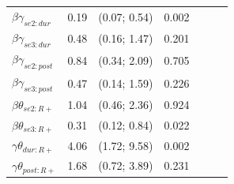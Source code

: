 \documentclass[
  ignorenonframetext,
  serif,
  professionalfont,
  usenames,
  dvipsnames,
  aspectratio = 169]{beamer}
\begin{document}
\begin{frame}{}
\begin{table}[h]
\begin{tabular}{lcccccc}
        \multicolumn{1}{l|}{$\beta\gamma_{se2:dur}$}  & {\color[HTML]{000000} 0.19} & {\color[HTML]{000000} (0.07; 0.54)} & \multicolumn{1}{c|}{{\color[HTML]{000000} 0.002}} & {\color[HTML]{000000} }      &              &                 \\
        \multicolumn{1}{l|}{$\beta\gamma_{se3:dur}$}  & {\color[HTML]{000000} 0.48} & {\color[HTML]{000000} (0.16; 1.47)} & \multicolumn{1}{c|}{{\color[HTML]{000000} 0.201}}            & {\color[HTML]{000000} }      &              &                 \\
        \multicolumn{1}{l|}{$\beta\gamma_{se2:post}$} & {\color[HTML]{000000} 0.84} & {\color[HTML]{000000} (0.34; 2.09)} & \multicolumn{1}{c|}{{\color[HTML]{000000} 0.705}}            & {\color[HTML]{000000} }      &              &                 \\
        \multicolumn{1}{l|}{$\beta\gamma_{se3:post}$} & {\color[HTML]{000000} 0.47} & {\color[HTML]{000000} (0.14; 1.59)} & \multicolumn{1}{c|}{{\color[HTML]{000000} 0.226}}            & {\color[HTML]{000000} }      &              &                 \\
        \multicolumn{1}{l|}{$\beta\theta_{se2:R+}$}   & {\color[HTML]{000000} 1.04} & {\color[HTML]{000000} (0.46; 2.36)} & \multicolumn{1}{c|}{{\color[HTML]{000000} 0.924}}            & {\color[HTML]{000000} }      &              &                 \\
        \multicolumn{1}{l|}{$\beta\theta_{se3:R+}$}   & {\color[HTML]{000000} 0.31} & {\color[HTML]{000000} (0.12; 0.84)} & \multicolumn{1}{c|}{{\color[HTML]{000000} 0.022}} & {\color[HTML]{000000} }      &              &                 \\
        \multicolumn{1}{l|}{$\gamma\theta_{dur:R+}$}  & {\color[HTML]{000000} 4.06} & {\color[HTML]{000000} (1.72; 9.58)} & \multicolumn{1}{c|}{{\color[HTML]{000000} 0.002}}            & {\color[HTML]{000000} }      &              &                 \\
        \multicolumn{1}{l|}{$\gamma\theta_{post:R+}$} & {\color[HTML]{000000} 1.68} & {\color[HTML]{000000} (0.72; 3.89)} & \multicolumn{1}{c|}{{\color[HTML]{000000} 0.231}} & {\color[HTML]{000000} }      &              &                 \\ \hline
    \end{tabular}
    \label{tab:est2}
\end{table}
\end{frame}
\end{document}
